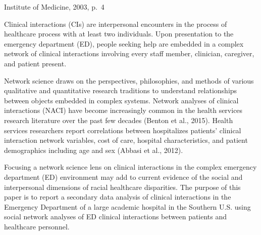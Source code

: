 \documentclass[
]{article}
\begin{document}
Institute of Medicine, 2003, p.~4

Clinical interactions (CIs) are interpersonal encounters in the process
of healthcare process with at least two individuals. Upon presentation
to the emergency department (ED), people seeking help are embedded in a
complex network of clinical interactions involving every staff member,
clinician, caregiver, and patient present.

Network science draws on the perspectives, philosophies, and methods of
various qualitative and quantitative research traditions to understand
relationships between objects embedded in complex systems. Network
analyses of clinical interactions (NACI) have become increasingly common
in the health services research literature over the past few decades
(Benton et al., 2015). Health services researchers report correlations
between hospitalizes patients' clinical interaction network variables,
cost of care, hospital characteristics, and patient demographics
including age and sex (Abbasi et al., 2012).

Focusing a network science lens on clinical interactions in the complex
emergency department (ED) environment may add to current evidence of the
social and interpersonal dimensions of racial healthcare disparities.
The purpose of this paper is to report a secondary data analysis of
clinical interactions in the Emergency Department of a large academic
hospital in the Southern U.S. using social network analyses of ED
clinical interactions between patients and healthcare personnel.
\end{document}
